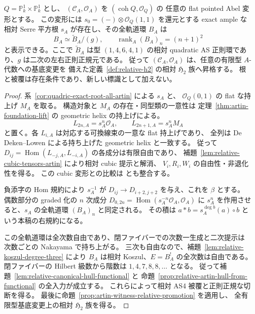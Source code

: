 \begin{theorem}
\label{thm:quadric-all-artin-h2}
$Q=\mathbb P^1_k\times\mathbb P^1_k$ とし、
$(\mathcal C_A,\mathcal O_A)$ を $(\operatorname{coh}Q,\mathcal O_Q)$ の
任意の flat pointed Abel 変形とする。
この変形には $s_0=(-)\otimes\mathcal O_Q(1,1)$ を還元とする
exact ample な相対 Serre 平方根 $s_A$ が存在し、その全軌道環 $B_A$ は
\[
 B_A\simeq\widetilde B_A/(g),\qquad
 \operatorname{rank}_A(B_A)_n=(n+1)^2
\]
と表示できる。ここで $\widetilde B_A$ は型 $(1,4,6,4,1)$ の相対 quadratic
AS 正則環であり、$g$ は二次の左右正則正規元である。
従って $(\mathcal C_A,\mathcal O_A)$ は、任意の有限型 $A$-代数への基底変更を
備えた定義~\ref{def:relative-h2} の相対 $\mathfrak H_2$ 族へ昇格する。
根と被覆は存在条件であり、新しい標識として加えない。
\end{theorem}
\begin{proof}
系~\ref{cor:quadric-exact-root-all-artin} による $s_A$ と、
$\mathcal O_Q(0,1)$ の flat な持上げ $M_A$ を取る。
構造対象と $M_A$ の存在・同型類の一意性は
定理~\ref{thm:artin-foundation-lift} の geometric helix の持上げによる。
\[
 L_{2n,A}=s_A^n\mathcal O_A,\qquad L_{2n+1,A}=s_A^nM_A
\]
と置く。各 $L_{i,A}$ は対応する可換線束の一意な flat 持上げであり、
全列は De Deken--Lowen による持ち上げた geometric helix と一致する。
従って $D_{ij}=\operatorname{Hom}(L_{-j,A},L_{-i,A})$ の各成分は有限自由であり、
補題~\ref{lem:relative-cubic-tensors-artin} により相対 cubic 提示と解消、
$V_i,R_i,W_i$ の自由性・非退化性を得る。
この cubic 変形との比較は \cite[Theorem 8.1.2, \S8.3]{VdB2011} とも整合する。

負添字の Hom 規約により $s_A^{-1}$ が
$D_{ij}\to D_{i+2,j+2}$ を与え、これを $\beta$ とする。
偶数部分の graded 化の $n$ 次成分
$D_{0,2n}=\operatorname{Hom}(s_A^{-n}\mathcal O_A,\mathcal O_A)$ に
$s_A^n$ を作用させると、$s_A$ の全軌道環 $(B_A)_n$ と同定される。
その積は $a*b=s_A^{\deg b}(a)\circ b$ という本稿の右規約になる。

この全軌道環は全次数自由であり、閉ファイバーでの次数一生成と二次提示は
次数ごとの Nakayama で持ち上がる。
三次も自由なので、補題~\ref{lem:relative-koszul-degree-three} により
$B_A$ は相対 Koszul、$E=B_A^!$ の全次数は自由である。
閉ファイバーの Hilbert 級数から階数は $1,4,7,8,8,\ldots$ となる。
従って補題~\ref{lem:relative-canonical-hull-functional} と
命題~\ref{prop:relative-artin-hull-from-functional} の全入力が成立する。
これらによって相対 AS4 被覆と正則正規な切断を得る。
最後に命題~\ref{prop:artin-witness-relative-promotion} を適用し、
全有限型基底変更上の相対 $\mathfrak H_2$ 族を得る。
\end{proof}

